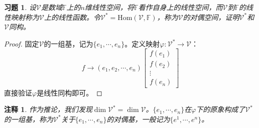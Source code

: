 \documentclass[UTF8]{ctexart}
\newtheorem{ex}[thm]{习题}
\newtheorem{rmk}[thm]{注释}
\begin{document}
\begin{ex}
设$\mathcal{V}$是数域$\mathbb{F}$上的$n$维线性空间，将$\mathbb{F}$看作自身上的线性空间，而$\mathcal{V}$到$\mathbb{F}$的线性映射称为$\mathcal{V}$上的线性函数。令$\mathcal{V}^* = \mathrm{Hom}(\mathcal{V}, \mathbb{F})$，称为$\mathcal{V}$的对偶空间，证明$\mathcal{V}^{*}$和$\mathcal{V}$同构。
\end{ex}
\begin{proof}
固定$\mathcal{V}$的一组基，记为$\{e_1, \cdots, e_n\}$。定义映射$\varphi: \mathcal{V}^{*} \to \mathcal{V}$：
\[
f \to (e_1, e_2, \cdots, e_n)\begin{bmatrix}
f(e_1) \\
f(e_2) \\
\vdots \\
f(e_n)
\end{bmatrix}
\]
直接验证$\varphi$是线性同构即可。
\end{proof}
\begin{rmk}
作为推论，我们发现$\dim \mathcal{V}^{*} = \dim \mathcal{V}$。$\{e_1, \cdots, e_n\}$在$\varphi$下的原象构成了$\mathcal{V}^{*}$的一组基，称为$\mathcal{V}^{*}$关于$\{e_1, \cdots, e_n\}$的对偶基，一般记为$\{e^1, \cdots, e^n\}$。
\end{rmk}
\end{document}
